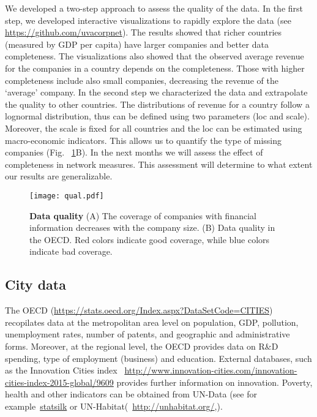 We developed a two-step approach to assess the quality of the data. In the first step, we developed interactive visualizations to rapidly explore the data (see \url{https://github.com/uvacorpnet}). The results showed that richer countries (measured by GDP per capita) have larger companies and better data completeness. 
The visualizations also showed that the observed average revenue for the companies in a country depends on the completeness. 
Those with higher completeness include also small companies, 
decreasing the revenue of the `average' company. 
In the second step we characterized the data and extrapolate the quality to other countries. 
The distributions of revenue for a country follow a lognormal distribution, 
thus can be defined using two parameters (loc and scale). 
Moreover, the scale is fixed for all countries and the loc can be estimated using macro-economic indicators. 
This allows us to quantify the type of missing companies (Fig. ~\ref{fig:qual}B). 
In the next months we will assess the effect of completeness in network measures. 
This assessment will determine to what extent our results are generalizable. 

\begin{figure}
\begin{center}
\texttt{[image: qual.pdf]}
\caption{\textbf{Data quality} (A) The coverage of companies with financial information decreases with the company size. (B) Data quality in the OECD. Red colors indicate good coverage, while blue colors indicate bad coverage.}
\label{fig:qual}
\end{center}
\end{figure}



\subsection{City data}
The OECD (\url{https://stats.oecd.org/Index.aspx?DataSetCode=CITIES}) recopilates data at the metropolitan area level on population, GDP, pollution, unemployment rates, number of patents, and geographic and administrative forms.
Moreover, at the regional level, 
the OECD provides data on R\&D spending, type of employment (business) and education.
External databases, such as the Innovation Cities index ~\url{http://www.innovation-cities.com/innovation-cities-index-2015-global/9609} provides further information on innovation.
Poverty, health and other indicators can be obtained from UN-Data (see for example~\href{http://www.statsilk.com/open-data/sources-global-open-data-national-regional-and-city-levels-links-public-databases}{statsilk} or UN-Habitat(~\url{http://unhabitat.org/},\cite{leautier2006cities}).


